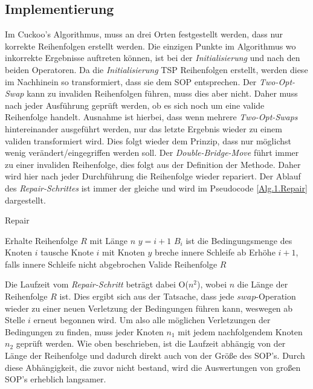 \documentclass[conference]{IEEEtran}
\begin{document}
    \subsection{Implementierung} \label{Implementierung Repair}
      Im Cuckoo's Algorithmus, muss an drei Orten festgestellt werden, dass nur korrekte Reihenfolgen erstellt werden. 
      Die einzigen Punkte im Algorithmus wo inkorrekte Ergebnisse auftreten können, ist bei der \textit{Initialisierung} 
      und nach den beiden Operatoren. Da die \textit{Initialisierung} TSP Reihenfolgen erstellt, werden diese im Nachhinein so 
      transformiert, dass sie dem SOP entsprechen. Der \textit{Two-Opt-Swap} kann zu invaliden Reihenfolgen führen, muss dies aber 
      nicht. Daher muss nach jeder Ausführung geprüft werden, ob es sich noch um eine valide Reihenfolge handelt. 
      Ausnahme ist hierbei, dass wenn mehrere \textit{Two-Opt-Swaps} hintereinander ausgeführt werden, nur das letzte Ergebnis 
      wieder zu einem validen transformiert wird. Dies folgt wieder dem Prinzip, dass nur möglichst wenig verändert/eingegriffen 
      werden soll. Der \textit{Double-Bridge-Move} führt immer zu einer invaliden Reihenfolge, dies folgt aus der Definition der Methode. 
      Daher wird hier nach jeder Durchführung die Reihenfolge wieder repariert. Der Ablauf des \textit{Repair-Schrittes} ist immer 
      der gleiche und wird im Pseudocode \ref{Alg.1.Repair} dargestellt.


      
      \begin{algorithm}
        \caption{Repair}\label{Alg.1.Repair}
        \begin{algorithmic}[1]
        \State Erhalte Reihenfolge $R$ mit Länge $n$
          \State $y = i+1$
          \State $B_i$ ist die Bedingungsmenge des Knoten $i$
              \State tausche Knote $i$ mit Knoten $y$
              \State breche innere Schleife ab
            \EndIf
          \EndWhile
          \State Erhöhe $i+1$, falls innere Schleife nicht abgebrochen
        \EndWhile
        \State Valide Reihenfolge $R$
        
        \end{algorithmic}
        \end{algorithm}

      Die Laufzeit vom \textit{Repair-Schritt} beträgt dabei O($n^2$), wobei $n$ die Länge der Reihenfolge $R$ ist. Dies ergibt sich aus der Tatsache, dass
      jede $swap$-Operation wieder zu einer neuen Verletzung der Bedingungen führen kann, weswegen ab Stelle $i$ erneut begonnen wird.
      Um also alle möglichen Verletzungen der Bedingungen zu finden, muss jeder Knoten $n_1$ mit jedem nachfolgendem Knoten $n_2$ geprüft werden. 
      Wie oben beschrieben, ist die Laufzeit abhängig von der Länge der Reihenfolge und dadurch direkt auch von der Größe des SOP's. 
      Durch diese Abhängigkeit, die zuvor nicht bestand, wird die Auswertungen von großen SOP's erheblich langsamer.
  
\end{document}
